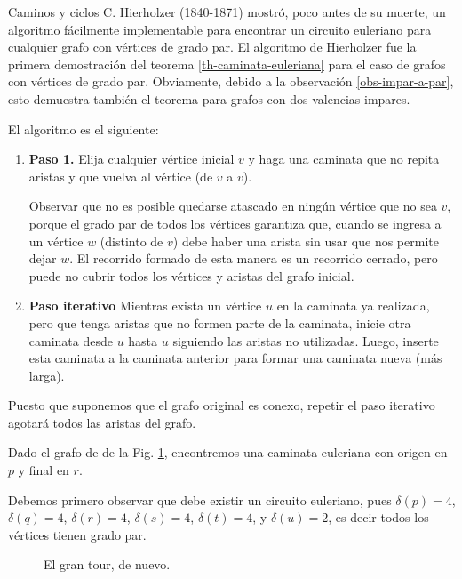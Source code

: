 \begin{section}{Caminos y ciclos}
C. Hierholzer (1840-1871) mostró, poco antes de su muerte, un algoritmo fácilmente implementable para encontrar un circuito euleriano  para cualquier grafo  con vértices de grado  par. El algoritmo de Hierholzer fue la primera demostración del teorema \ref{th-caminata-euleriana} para el caso  de grafos con vértices de grado par. Obviamente,  debido a la observación  \ref{obs-impar-a-par}, esto demuestra también el teorema para grafos con dos valencias impares.

El  algoritmo es el siguiente: 
\begin{enumerate}
    \item \textbf{Paso 1.} Elija cualquier vértice  inicial $v$ y haga una caminata  que no repita aristas y  que vuelva al vértice (de $v$ a $v$). 
    
    Observar que no es posible quedarse atascado en ningún vértice que no sea $v$, porque el grado par de todos los vértices garantiza que, cuando se ingresa a un vértice $w$ (distinto de $v$) debe haber una  arista sin usar que nos permite dejar $w$. El recorrido formado de esta manera es un recorrido cerrado, pero puede no cubrir todos los vértices y aristas del grafo inicial.
    \item \textbf{Paso iterativo} Mientras exista un vértice $u$ en la caminata ya realizada, pero que tenga aristas que no formen parte de la caminata, inicie otra caminata desde $u$ hasta $u$ siguiendo las aristas no utilizadas. Luego,  inserte esta  caminata a la caminata  anterior para formar una caminata nueva (más larga).
\end{enumerate}

Puesto que suponemos que el grafo original es conexo, repetir el paso iterativo agotará todos las aristas del grafo.
  
\begin{ejemplo*} Dado  el  grafo de de la  Fig. \ref{f5.7.1}, encontremos una caminata euleriana con origen en $p$ y final en $r$. 

Debemos primero observar que  debe existir un circuito euleriano, pues $\delta(p)=4$, $\delta(q)=4$, $\delta(r)=4$, $\delta(s)=4$,
$\delta(t)=4$, y $\delta(u)=2$,  es decir todos los vértices tienen grado par. 


\begin{figure}[ht]
    \begin{center}
    \end{center}
    \caption{El gran tour, de nuevo.} \label{f5.7.1}
\end{figure}


\end{ejemplo*}
\end{section}
